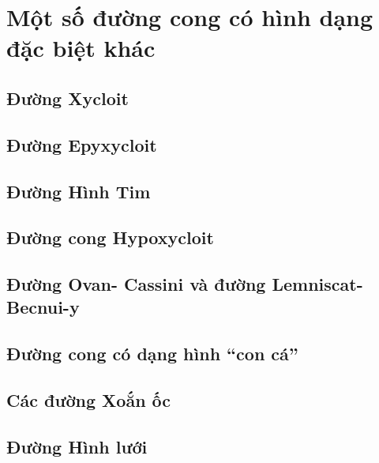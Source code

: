 \chapter{Một số đường cong có hình dạng đặc biệt khác}
\section{Đường Xycloit}
\section{Đường Epyxycloit}
\section{Đường Hình Tim}
\section{Đường cong Hypoxycloit}
\section{Đường Ovan- Cassini và đường Lemniscat-Becnui-y}
\section{Đường cong có dạng hình ``con cá''}
\section{Các đường Xoắn ốc}
\section{Đường Hình lưới}